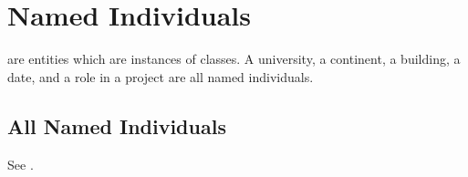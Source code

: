 \documentclass[letterpaper,10pt,english]{sphinxmanual}
\begin{document}
\begin{sphinxShadowBox}

\sphinxAtStartPar
{}
\end{sphinxShadowBox}


\chapter{Named Individuals}
\label{\detokenize{named-individuals:named-individuals}}\label{\detokenize{named-individuals::doc}}
\sphinxAtStartPar
{} are entities which are instances of classes.  A university, a
continent, a building, a date, and a role in a project are all named individuals.


\section{All Named Individuals}
\label{\detokenize{named-individuals:all-named-individuals}}
\sphinxAtStartPar
See {\hyperref[\detokenize{named-individuals:table-9}]{}}.
\end{document}
